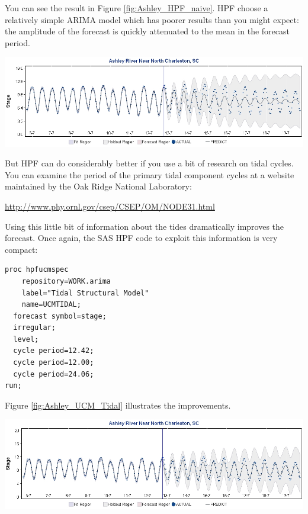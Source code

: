 \documentclass[10pt]{sugconf-ish}
\begin{document}
You can see the result in Figure \ref{fig:Ashley_HPF_naive}. HPF choose a relatively simple ARIMA model which has poorer results than you might expect: the amplitude of the forecast is quickly attenuated to the mean in the forecast period.

\begin{minipage}{\linewidth} 
\centering
\includegraphics[width=6in,keepaspectratio]{AshleyArima.jpg} 
\label{fig:Ashley_HPF_naive}
\end{minipage} 

But HPF can do considerably better if you use a bit of research on tidal cycles. You can examine the period of the primary tidal component cycles at a website maintained by the Oak Ridge National Laboratory:

\hspace*{2em}\url{http://www.phy.ornl.gov/csep/CSEP/OM/NODE31.html}

Using this little bit of information about the tides dramatically improves the forecast. Once again, the SAS HPF code to exploit this information is very compact:

\small
\begin{verbatim}
proc hpfucmspec 
    repository=WORK.arima
    label="Tidal Structural Model"
    name=UCMTIDAL;
  forecast symbol=stage;
  irregular;
  level;
  cycle period=12.42;
  cycle period=12.00;
  cycle period=24.06;
run;
\end{verbatim}
\normalsize

Figure \ref{fig:Ashley_UCM_Tidal} illustrates the improvements.

\begin{minipage}{\linewidth} 
\centering
\includegraphics[width=6in,keepaspectratio]{AshleyStructural.jpg} 
\label{fig:Ashley_UCM_Tidal}
\end{minipage} 
\end{document}
